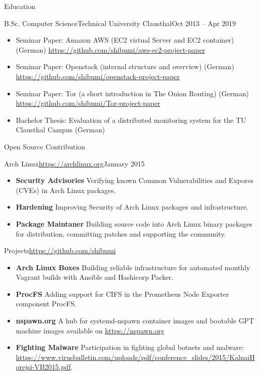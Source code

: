 \documentclass[]{mcdowellcv}
\begin{document}
\begin{cvsection}{Education}
\begin{cvsubsection}{B.Sc. Computer Science}{Technical University Clausthal}{Oct 2013 -- Apr 2019}
\begin{itemize}
\item Seminar Paper: Amazon AWS (EC2 virtual Server and EC2 container) (German) \url{https://github.com/shibumi/aws-ec2-project-paper}
\item Seminar Paper: Openstack (internal structure and overview) (German) \url{https://github.com/shibumi/openstack-project-paper}
\item Seminar Paper: Tor (a short introduction in The Onion Routing) (German) \url{https://github.com/shibumi/Tor-project-paper}
\item Bachelor Thesis: Evaluation of a distributed monitoring system for the TU Clausthal Campus (German)
\end{itemize}
\end{cvsubsection}

\end{cvsection}
\newpage
\begin{cvsection}{Open Source Contribution}
\begin{cvsubsection}{Arch Linux}{\url{https://archlinux.org}}{January 2015}
\begin{itemize}
\item \textbf{Security Advisories} Verifying known Common Vulnerabilities and Expores (CVEs) in Arch Linux packages.
\item \textbf{Hardening} Improving Security of Arch Linux packages and infrastructure.
\item \textbf{Package Maintaner} Building source code into Arch Linux binary packages for distribution, committing patches and supporting the community.
\end{itemize}
\end{cvsubsection}

\begin{cvsubsection}{Projects}{\url{https://github.com/shibumi}}{}
\begin{itemize}
\item \textbf{Arch Linux Boxes} Building reliable infrastructure for automated monthly Vagrant builds with Ansible and Hashicorp Packer.
\item \textbf{ProcFS} Adding support for CIFS in the Prometheus Node Exporter component ProcFS.
\item \textbf{nspawn.org} A hub for systemd-nspawn container images and bootable GPT machine images available on \url{https://nspawn.org}
\item \textbf{Fighting Malware} Participation in fighting global botnets and malware: \url{https://www.virusbulletin.com/uploads/pdf/conference_slides/2015/KalnaiHorejsi-VB2015.pdf}.
\end{itemize}
\end{cvsubsection}
\end{cvsection}
\end{document}

